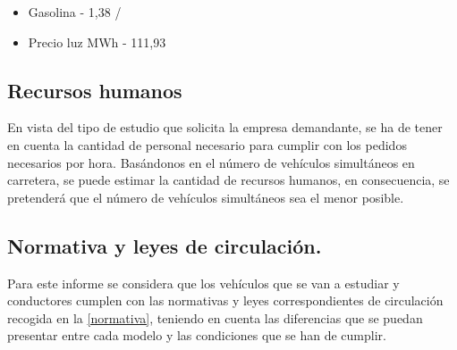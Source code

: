 \begin{itemize}
    \item{Gasolina - 1,38 /}
    \item{Precio luz MWh - 111,93 }
\end{itemize}


\subsection{Recursos humanos}
\label{consideraciones_preliminares_recursos_humanos}
En vista del tipo de estudio que solicita la empresa demandante, se ha de tener en cuenta la cantidad de personal necesario para cumplir con los pedidos necesarios por hora. Basándonos en el número de vehículos simultáneos en carretera, se puede estimar la cantidad de recursos humanos, en consecuencia, se pretenderá que el número de vehículos simultáneos sea el menor posible.

\subsection{Normativa y leyes de circulación.}
\label{consideraciones_preliminares_leyes de circulación}
Para este informe se considera que los vehículos que se van a estudiar y conductores cumplen con las normativas y leyes correspondientes de circulación recogida en la \autoref{normativa}, teniendo en cuenta las diferencias que se puedan presentar entre cada modelo y las condiciones que se han de cumplir.